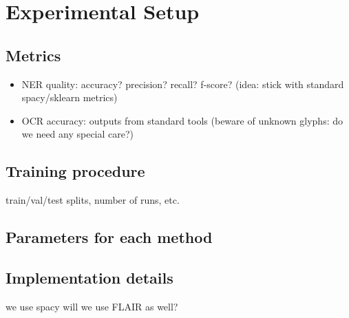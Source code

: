 \section{Experimental Setup}

\subsection{Metrics}
\begin{itemize}
    \item NER quality: accuracy? precision? recall? f-score? (idea: stick with standard spacy/sklearn metrics)
    \item OCR accuracy: outputs from standard tools (beware of unknown glyphs: do we need any special care?)
\end{itemize}

\subsection{Training procedure}
train/val/test splits, number of runs, etc.


\subsection{Parameters for each method}


\subsection{Implementation details}
we use spacy 
will we use FLAIR as well?